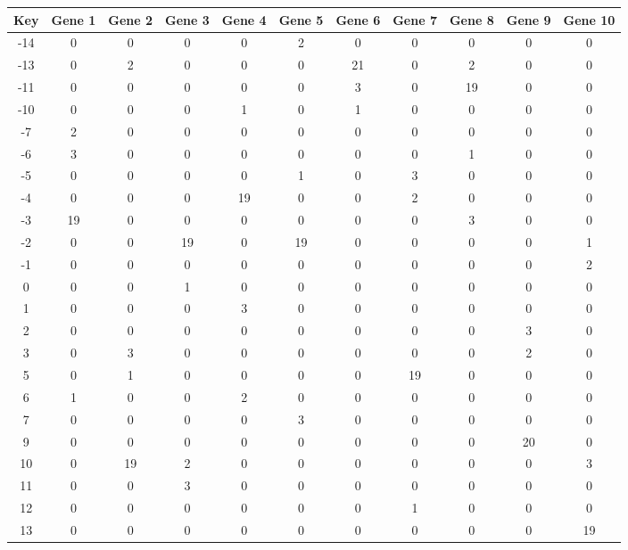 \begin{tabular}{|c|c|c|c|c|c|c|c|c|c|c|}
\hline
Key & Gene 1 & Gene 2 & Gene 3 & Gene 4 & Gene 5 & Gene 6 & Gene 7 & Gene 8 & Gene 9 & Gene 10 \\
\hline
-14 & 0 & 0 & 0 & 0 & 2 & 0 & 0 & 0 & 0 & 0 \\
-13 & 0 & 2 & 0 & 0 & 0 & 21 & 0 & 2 & 0 & 0 \\
-11 & 0 & 0 & 0 & 0 & 0 & 3 & 0 & 19 & 0 & 0 \\
-10 & 0 & 0 & 0 & 1 & 0 & 1 & 0 & 0 & 0 & 0 \\
-7 & 2 & 0 & 0 & 0 & 0 & 0 & 0 & 0 & 0 & 0 \\
-6 & 3 & 0 & 0 & 0 & 0 & 0 & 0 & 1 & 0 & 0 \\
-5 & 0 & 0 & 0 & 0 & 1 & 0 & 3 & 0 & 0 & 0 \\
-4 & 0 & 0 & 0 & 19 & 0 & 0 & 2 & 0 & 0 & 0 \\
-3 & 19 & 0 & 0 & 0 & 0 & 0 & 0 & 3 & 0 & 0 \\
-2 & 0 & 0 & 19 & 0 & 19 & 0 & 0 & 0 & 0 & 1 \\
-1 & 0 & 0 & 0 & 0 & 0 & 0 & 0 & 0 & 0 & 2 \\
0 & 0 & 0 & 1 & 0 & 0 & 0 & 0 & 0 & 0 & 0 \\
1 & 0 & 0 & 0 & 3 & 0 & 0 & 0 & 0 & 0 & 0 \\
2 & 0 & 0 & 0 & 0 & 0 & 0 & 0 & 0 & 3 & 0 \\
3 & 0 & 3 & 0 & 0 & 0 & 0 & 0 & 0 & 2 & 0 \\
5 & 0 & 1 & 0 & 0 & 0 & 0 & 19 & 0 & 0 & 0 \\
6 & 1 & 0 & 0 & 2 & 0 & 0 & 0 & 0 & 0 & 0 \\
7 & 0 & 0 & 0 & 0 & 3 & 0 & 0 & 0 & 0 & 0 \\
9 & 0 & 0 & 0 & 0 & 0 & 0 & 0 & 0 & 20 & 0 \\
10 & 0 & 19 & 2 & 0 & 0 & 0 & 0 & 0 & 0 & 3 \\
11 & 0 & 0 & 3 & 0 & 0 & 0 & 0 & 0 & 0 & 0 \\
12 & 0 & 0 & 0 & 0 & 0 & 0 & 1 & 0 & 0 & 0 \\
13 & 0 & 0 & 0 & 0 & 0 & 0 & 0 & 0 & 0 & 19 \\
\hline
\end{tabular}